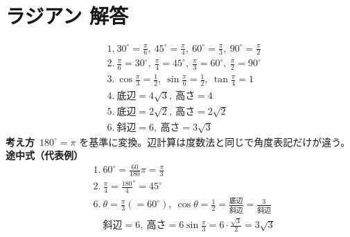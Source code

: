 \documentclass[paper=b4j,landscape,twocolumn,fleqn]{jlreq}
\begin{document}
\newpage
\section{ラジアン 解答}
\begin{align*}
&1.\ 30^\circ=\frac\pi6,\ 45^\circ=\frac\pi4,\ 60^\circ=\frac\pi3,\ 90^\circ=\frac\pi2\\[0.45em]
&2.\ \frac\pi6=30^\circ,\ \frac\pi4=45^\circ,\ \frac\pi3=60^\circ,\ \frac\pi2=90^\circ\\[0.45em]
&3.\ \cos\frac\pi3=\frac12,\ \sin\frac\pi6=\frac12,\ \tan\frac\pi4=1\\[0.45em]
&4.\ \text{底辺}=4\sqrt3,\ \text{高さ}=4\\[0.45em]
&5.\ \text{底辺}=2\sqrt2,\ \text{高さ}=2\sqrt2\\[0.45em]
&6.\ \text{斜辺}=6,\ \text{高さ}=3\sqrt3
\end{align*}
\textbf{考え方}\
$180^\circ=\pi$ を基準に変換。辺計算は度数法と同じで角度表記だけが違う。\\
\textbf{途中式（代表例）}
\begin{align*}
&1.\ 60^\circ=\frac{60}{180}\pi=\frac\pi3\\
&2.\ \frac\pi4=\frac{180}{4}^\circ=45^\circ\\
&6.\ \theta=\frac\pi3(=60^\circ),\ \cos\theta=\frac12=\frac{\text{底辺}}{\text{斜辺}}=\frac{3}{\text{斜辺}}\\
&\quad \text{斜辺}=6,\ \text{高さ}=6\sin\frac\pi3=6\cdot\frac{\sqrt3}{2}=3\sqrt3
\end{align*}

\newpage
\end{document}
